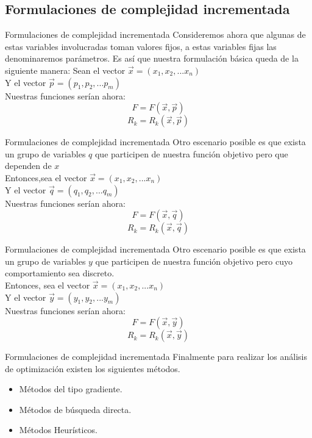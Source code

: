 \documentclass{beamer}
\begin{document}
    \subsection{Formulaciones de complejidad incrementada}
        \begin{frame}{Formulaciones de complejidad incrementada}
            Consideremos ahora que algunas de estas variables involucradas
            toman valores fijos, a estas variables fijas las denominaremos parámetros.
            Es así que nuestra formulación básica queda de la siguiente manera:
            Sean el vector $\vec{x}=(x_{1}, x_{2},...x_{n}) $\\
            Y el vector $\vec{p}=(p_{1}, p_{2},...p_{m}) $\\
            Nuestras funciones serían ahora:
            $$F=F(\vec{x},\vec{p})$$
            $$R_{k}=R_{k}(\vec{x},\vec{p})$$
        \end{frame}
        \begin{frame}{Formulaciones de complejidad incrementada}
            Otro escenario posible es que exista un grupo de variables $q$
            que participen de nuestra función objetivo pero que dependen de $x$\\
            Entonces,sea el vector $\vec{x}=(x_{1}, x_{2},...x_{n}) $\\
            Y el vector $\vec{q}=(q_{1}, q_{2},...q_{m}) $\\
            Nuestras funciones serían ahora:
            $$F=F(\vec{x},\vec{q})$$
            $$R_{k}=R_{k}(\vec{x},\vec{q})$$
        \end{frame}
        \begin{frame}{Formulaciones de complejidad incrementada}
            Otro escenario posible es que exista un grupo de variables $y$
            que participen de nuestra función objetivo pero cuyo
            comportamiento sea discreto.\\
            Entonces, sea el vector $\vec{x}=(x_{1}, x_{2},...x_{n}) $\\
            Y el vector $\vec{y}=(y_{1}, y_{2},...y_{m}) $\\
            Nuestras funciones serían ahora:
            $$F=F(\vec{x},\vec{y})$$
            $$R_{k}=R_{k}(\vec{x},\vec{y})$$
        \end{frame}
        \begin{frame}{Formulaciones de complejidad incrementada}
            Finalmente para realizar los análisis de optimización existen los siguientes 
            métodos.
            \begin{itemize}
                \item Métodos del tipo gradiente.
                \item Métodos de búsqueda directa.
                \item Métodos Heurísticos.
            \end{itemize}
        \end{frame}      
\end{document}
